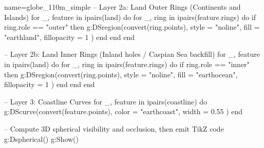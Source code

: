 \documentclass{standalone}
\begin{document}
\begin{luadraw}{name=globe_110m_simple}
    -- Layer 2a: Land Outer Rings (Continents and Islands)
    for _, feature in ipairs(land) do
        for _, ring in ipairs(feature.rings) do
            if ring.role == "outer" then
                g:DSregion(convert(ring.points), {
                    style = "noline",
                    fill = "earthland",
                    fillopacity = 1
                })
            end
        end
    end

    -- Layer 2b: Land Inner Rings (Inland holes / Caspian Sea backfill)
    for _, feature in ipairs(land) do
        for _, ring in ipairs(feature.rings) do
            if ring.role == "inner" then
                g:DSregion(convert(ring.points), {
                    style = "noline",
                    fill = "earthocean",
                    fillopacity = 1
                })
            end
        end
    end

    -- Layer 3: Coastline Curves
    for _, feature in ipairs(coastline) do
        g:DScurve(convert(feature.points), {
            color = "earthcoast",
            width = 0.55
        })
    end

    -- Compute 3D spherical visibility and occlusion, then emit TikZ code
    g:Dspherical()
    g:Show()
\end{luadraw}
\end{document}
